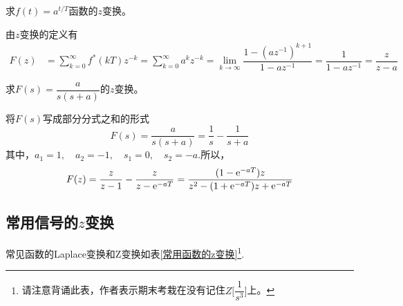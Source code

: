 \examples 求$f(t) = a^{t/T}$函数的$z$变换。

\solve 由$z$变换的定义有
\begin{align*}
	F(z) &= \sum_{k=0}^{\infty} f^*(kT)z^{-k} = \sum_{k = 0}^{\infty} a^{k} z^{-k}= \lim\limits_{k \to \infty} \dfrac{1 - (az^{-1})^{k+1}}{1-az^{-1}} = \dfrac{1}{1 - az^{-1}} = \dfrac{z}{z-a}
\end{align*}
\vspace*{1em}

\examples 求$F(s) = \dfrac{a}{s(s+a)}$的$z$变换。

\solve 将$F(s)$写成部分分式之和的形式
\[
F(s) = \dfrac{a}{s(s+a)} = \dfrac{1}{s} - \dfrac{1}{s+a}
\]
其中，$a_1 = 1,\quad a_2 = -1,\quad s_1 = 0, \quad s_2 = -a.$所以，
\[
F(z) = \dfrac{z}{z-1} - \dfrac{z}{z - {\rm{e}}^{-aT}} = \dfrac{(1 - {\rm{e}}^{-aT})z}{z^2 - (1 + {\rm{e}}^{-aT})z+{\rm{e}}^{-aT}}
\]

\subsection{常用信号的$z$变换}
常见函数的Laplace变换和Z变换如表\ref{常用函数的z变换}\footnote{请注意背诵此表，作者表示期末考栽在没有记住$Z\bigg[\dfrac{1}{s^3}\bigg]$上。}.

{
	\centering
	\vspace*{-2em}
	\label{常用函数的z变换}
}



